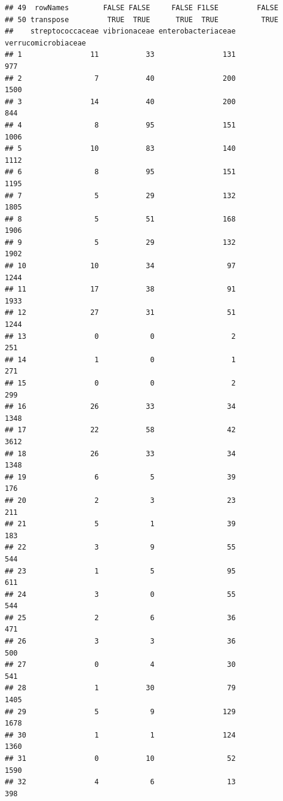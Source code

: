 \documentclass[12pt]{beamer}\usepackage[]{graphicx}\usepackage[]{color}
\makeatletter
\newenvironment{kframe}{%
 \def\at@end@of@kframe{}%
 \ifinner\ifhmode%
  \def\at@end@of@kframe{\end{minipage}}%
  \begin{minipage}{\columnwidth}%
 \fi\fi%
 \def\FrameCommand##1{\hskip\@totalleftmargin \hskip-\fboxsep
 \colorbox{shadecolor}{##1}\hskip-\fboxsep
     \hskip-\linewidth \hskip-\@totalleftmargin \hskip\columnwidth}%
 \MakeFramed {\advance\hsize-\width
   \@totalleftmargin\z@ \linewidth\hsize
   \@setminipage}}%
 {\par\unskip\endMakeFramed%
 \at@end@of@kframe}
\newenvironment{knitrout}{}{} %
\makeatother
\begin{document}
\begin{frame}[fragile]
\begin{knitrout}
\begin{kframe}
\begin{verbatim}
## 49  rowNames        FALSE FALSE     FALSE F1LSE         FALSE
## 50 transpose         TRUE  TRUE      TRUE  TRUE          TRUE
##    streptococcaceae vibrionaceae enterobacteriaceae verrucomicrobiaceae
## 1                11           33                131                 977
## 2                 7           40                200                1500
## 3                14           40                200                 844
## 4                 8           95                151                1006
## 5                10           83                140                1112
## 6                 8           95                151                1195
## 7                 5           29                132                1805
## 8                 5           51                168                1906
## 9                 5           29                132                1902
## 10               10           34                 97                1244
## 11               17           38                 91                1933
## 12               27           31                 51                1244
## 13                0            0                  2                 251
## 14                1            0                  1                 271
## 15                0            0                  2                 299
## 16               26           33                 34                1348
## 17               22           58                 42                3612
## 18               26           33                 34                1348
## 19                6            5                 39                 176
## 20                2            3                 23                 211
## 21                5            1                 39                 183
## 22                3            9                 55                 544
## 23                1            5                 95                 611
## 24                3            0                 55                 544
## 25                2            6                 36                 471
## 26                3            3                 36                 500
## 27                0            4                 30                 541
## 28                1           30                 79                1405
## 29                5            9                129                1678
## 30                1            1                124                1360
## 31                0           10                 52                1590
## 32                4            6                 13                 398

\end{verbatim}
\end{kframe}
\end{knitrout}
\end{frame}
\end{document}

